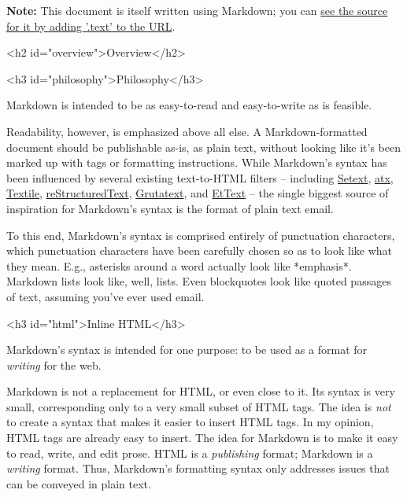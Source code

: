\textbf{Note:} This document is itself written using Markdown; you
can \href{/projects/markdown/syntax.text}{see the source for it by adding '.text' to the URL}.

\noindent\makebox[\linewidth]{\rule{\linewidth}{0.4pt}}\medskip


<h2 id="overview">Overview</h2>

<h3 id="philosophy">Philosophy</h3>



Markdown is intended to be as easy-to-read and easy-to-write as is feasible.



Readability, however, is emphasized above all else. A Markdown-formatted
document should be publishable as-is, as plain text, without looking
like it's been marked up with tags or formatting instructions. While
Markdown's syntax has been influenced by several existing text-to-HTML
filters -- including \href{http://docutils.sourceforge.net/mirror/setext.html}{Setext}, \href{http://www.aaronsw.com/2002/atx/}{atx}, \href{http://textism.com/tools/textile/}{Textile}, \href{http://docutils.sourceforge.net/rst.html}{reStructuredText},
\href{http://www.triptico.com/software/grutatxt.html}{Grutatext}, and \href{http://ettext.taint.org/doc/}{EtText} -- the single biggest source of
inspiration for Markdown's syntax is the format of plain text email.



To this end, Markdown's syntax is comprised entirely of punctuation
characters, which punctuation characters have been carefully chosen so
as to look like what they mean. E.g., asterisks around a word actually
look like *emphasis*. Markdown lists look like, well, lists. Even
blockquotes look like quoted passages of text, assuming you've ever
used email.

<h3 id="html">Inline HTML</h3>



Markdown's syntax is intended for one purpose: to be used as a
format for \emph{writing} for the web.



Markdown is not a replacement for HTML, or even close to it. Its
syntax is very small, corresponding only to a very small subset of
HTML tags. The idea is \emph{not} to create a syntax that makes it easier
to insert HTML tags. In my opinion, HTML tags are already easy to
insert. The idea for Markdown is to make it easy to read, write, and
edit prose. HTML is a \emph{publishing} format; Markdown is a \emph{writing}
format. Thus, Markdown's formatting syntax only addresses issues that
can be conveyed in plain text.



